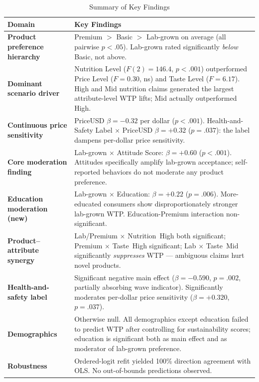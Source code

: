 \begin{table}[H]
\caption{Summary of Key Findings}
\label{tab:results_summary}
\centering
\small
\begin{tabular}{p{3.4cm}p{10cm}}
\toprule
Domain & Key Findings \\
\midrule
\textbf{Product preference hierarchy} & Premium $>$ Basic $>$ Lab-grown on average (all pairwise $p<.05$). Lab-grown rated significantly \textit{below} Basic, not above. \\ \midrule
\textbf{Dominant scenario driver} & Nutrition Level ($F(2)=146.4$, $p<.001$) outperformed Price Level ($F=0.30$, ns) and Taste Level ($F=6.17$). High and Mid nutrition claims generated the largest attribute-level WTP lifts; Mid actually outperformed High. \\ \midrule
\textbf{Continuous price sensitivity} & PriceUSD $\beta=-0.32$ per dollar ($p<.001$). Health-and-Safety Label $\times$ PriceUSD $\beta=+0.32$ ($p=.037$): the label dampens per-dollar price sensitivity. \\ \midrule
\textbf{Core moderation finding} & Lab-grown $\times$ Attitude Score: $\beta=+0.60$ ($p<.001$). Attitudes specifically amplify lab-grown acceptance; self-reported behaviors do not moderate any product preference. \\ \midrule
\textbf{Education moderation (new)} & Lab-grown $\times$ Education: $\beta=+0.22$ ($p=.006$). More-educated consumers show disproportionately stronger lab-grown WTP. Education-Premium interaction non-significant. \\ \midrule
\textbf{Product--attribute synergy} & Lab/Premium $\times$ Nutrition~High both significant; Premium $\times$ Taste~High significant; Lab $\times$ Taste~Mid significantly \textit{suppresses} WTP --- ambiguous claims hurt novel products. \\ \midrule
\textbf{Health-and-safety label} & Significant negative main effect ($\beta=-0.590$, $p=.002$, partially absorbing wave indicator). Significantly moderates per-dollar price sensitivity ($\beta=+0.320$, $p=.037$). \\ \midrule
\textbf{Demographics} & Otherwise null. All demographics except education failed to predict WTP after controlling for sustainability scores; education is significant both as main effect and as moderator of lab-grown preference. \\ \midrule
\textbf{Robustness} & Ordered-logit refit yielded 100\% direction agreement with OLS. No out-of-bounds predictions observed. \\
\bottomrule
\end{tabular}
\end{table}
